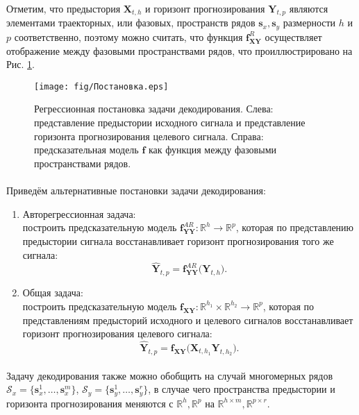\documentclass[12pt]{article}
\begin{document}
\newpage
\paragraph{}
Отметим, что предыстория $\textbf{X}_{t,h}$ и горизонт прогнозирования $\textbf{Y}_{t,p}$ являются элементами траекторных, или фазовых, пространств рядов $\textbf{s}_x, \textbf{s}_y$ размерности $h$ и $p$ соответственно, поэтому можно считать, что функция $\textbf{f}^R_{\textbf{XY}}$ осуществляет отображение между фазовыми пространствами рядов, что проиллюстрировано на Рис. \ref{fig:time_series}.

\vspace{1cm}
\begin{figure}[h]
    \centering
    \texttt{[image: fig/Постановка.eps]}
    \caption{Регрессионная постановка задачи декодирования. Слева: представление предыстории исходного сигнала и представление горизонта прогнозирования целевого сигнала. Справа: предсказательная модель $\textbf{f}$ как функция между фазовыми пространствами рядов.}
    \label{fig:time_series}
\end{figure}

\paragraph{}
Приведём альтернативные постановки задачи декодирования:
\begin{enumerate}
    \item Авторегрессионная задача:\\ построить предсказательную модель $\textbf{f}^{AR}_{\textbf{YY}}: \mathds{R}^h \rightarrow \mathds{R}^p$, которая по представлению предыстории сигнала восстанавливает горизонт прогнозирования того же сигнала:
   $$ \hat{\textbf{Y}}_{t,p} =  \textbf{f}^{AR}_{\textbf{YY}}\Big( \textbf{Y}_{t,h} \Big).$$
   \item Общая задача:\\
   построить предсказательную модель $\textbf{f}_{\textbf{XY}}: \mathds{R}^{h_1} \times \mathds{R}^{h_2} \rightarrow \mathds{R}^p$, которая по представлениям предысторий исходного и целевого сигналов восстанавливает горизонт прогнозирования целевого сигнала:
   $$ \hat{\textbf{Y}}_{t,p} =  \textbf{f}_{\textbf{XY}}\Big(\textbf{X}_{t,h_1} \textbf{Y}_{t,h_2} \Big).$$
\end{enumerate}
\paragraph{}
Задачу декодирования также можно обобщить на случай многомерных рядов $\mathcal{S}_x = \{\mathbf{s}_x^1, \dots, \mathbf{s}_x^m \}$, $\mathcal{S}_y = \{\mathbf{s}_y^1, \dots, \mathbf{s}_y^r \}$, в случае чего пространства предыстории и горизонта прогнозирования меняются с $\mathds{R}^h, \mathds{R}^p$ на $\mathds{R}^{h \times m}, \mathds{R}^{p \times r}$.
\end{document}
